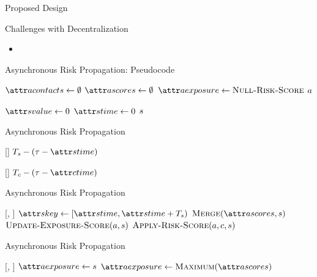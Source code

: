 \documentclass[11pt]{beamer}
\begin{document}
\begin{section}{Proposed Design}
\begin{frame}{Challenges with Decentralization}
\begin{itemize}
  \item 
\end{itemize}
\end{frame}

\begin{frame}{Asynchronous Risk Propagation: Pseudocode}
\begin{function}{\nCreateActor}
  \State $\aActorContacts \assign \emptyset$
  \State $\aActorScores \assign \emptyset$
  \State $\aActorExposure \assign \cNullRiskScore$
  \State \Return $a$
\end{function}
\begin{function}{\nNullRiskScore}
  \State $\aScoreValue \assign 0$
  \State $\aScoreTime \assign 0$
  \State \Return $s$
\end{function}
\end{frame}

\begin{frame}{Asynchronous Risk Propagation}
\begin{function}{\nRiskScoreTtl}[\vScore]
  \State \Return $\pScoreExpiry - (\vReferenceTime - \aScoreTime)$
\end{function}
\begin{function}{\nContactTtl}[\vContact]
  \State \Return $\pContactExpiry - (\vReferenceTime - \aContactTime)$
\end{function}
\end{frame}

\begin{frame}{Asynchronous Risk Propagation}
\begin{function}{\nHandleRiskScore}[\vActor, \vScore]
    \pause
    \State $\aScoreKey \assign [\aScoreTime, \aScoreTime + \pScoreExpiry)$
    \pause
    \State $\cMerge[\aActorScores, \vScore]$
    \pause
    \State $\cUpdateExposureScore[\vActor, \vScore]$
    \pause
    \ForEach{$\vContact \in \aActorContacts$}
      \State $\cApplyRiskScore[\vActor, \vContact, \vScore]$
    \EndFor
  \EndIf
\end{function}
\end{frame}

\begin{frame}{Asynchronous Risk Propagation}
\begin{function}{\nUpdateExposureScore}[\vActor, \vScore]
  \If{$\aActorExposureValue < \aScoreValue$}
    \pause
    \State $\aActorExposure \assign \vScore$
  \pause
    \pause
    \State $\aActorExposure \assign \cMaximum[\aActorScores]$
  \EndIf
\end{function}
\end{frame}


\end{section}
\end{document}
